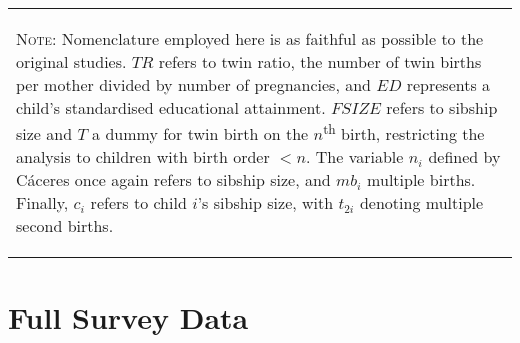 \documentclass{article}[11pt,subeqn]
\begin{document}
\begin{spacing}{1.5}
\begin{center}
\begin{rotate}{90}
\begin{tabular}{lp{4mm}lll}
\bottomrule 
\multicolumn{5}{p{19.2cm}}{\setstretch{0.9}\begin{footnotesize}\textsc{Note:} Nomenclature employed here is as faithful as possible to the original studies.  $TR$ refers to twin ratio, the number of twin births per mother divided by number of pregnancies, and $ED$ represents a child's standardised educational attainment. $FSIZE$ refers to sibship size and $T$ a dummy for twin birth on the $n$\textsuperscript{th} birth, restricting the analysis to children with birth order $<n$. The variable $n_i$ defined by C\'aceres once again refers to sibship size, and $mb_i$ multiple births. Finally, $c_i$ refers to child $i$'s sibship size, with $t_{2i}$ denoting multiple second births.\end{footnotesize}}\\
\end{tabular}
\end{rotate}
\label{tab:litrev}
\end{center}

\section{Full Survey Data}
\label{scn:surveys}
\vspace{-3mm}



\end{spacing}
\end{document}
